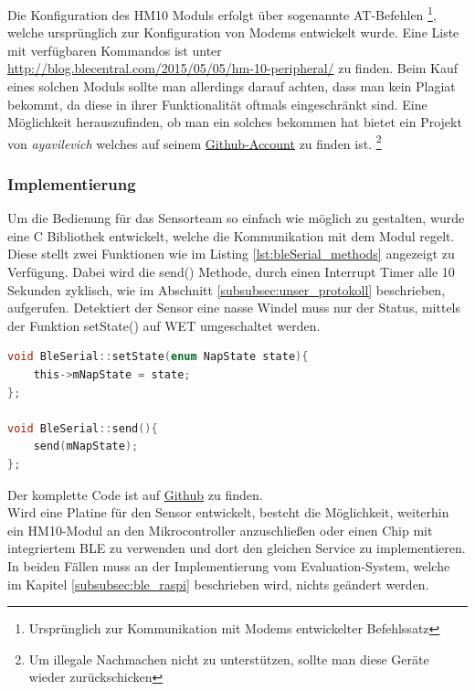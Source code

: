 Die Konfiguration des HM10 Moduls erfolgt über sogenannte AT-Befehlen \footnote{Ursprünglich zur Kommunikation mit Modems entwickelter Befehlssatz}, welche ursprünglich zur Konfiguration von Modems entwickelt wurde. Eine Liste mit verfügbaren Kommandos ist unter \url{http://blog.blecentral.com/2015/05/05/hm-10-peripheral/} zu finden. Beim Kauf eines solchen Moduls sollte man allerdings darauf achten, dass man kein Plagiat bekommt, da diese in ihrer Funktionalität oftmals eingeschränkt sind. Eine Möglichkeit herauszufinden, ob man ein solches bekommen hat bietet ein Projekt von \textit{ayavilevich} welches auf seinem \href{https://github.com/ayavilevich/arduino-ble-ident-n-set}{Github-Account} zu finden ist. \footnote{Um illegale Nachmachen nicht zu unterstützen, sollte man diese Geräte wieder zurückschicken} 

\subsubsection{Implementierung}
Um die Bedienung für das Sensorteam so einfach wie möglich zu gestalten, wurde eine C Bibliothek entwickelt, welche die Kommunikation mit dem Modul regelt. Diese stellt zwei Funktionen wie im Listing \ref{lst:bleSerial_methods} angezeigt zu Verfügung. Dabei wird die send() Methode, durch einen Interrupt Timer alle 10 Sekunden zyklisch, wie im Abschnitt \ref{subsubsec:unser_protokoll} beschrieben, aufgerufen. Detektiert der Sensor eine nasse Windel muss nur der Status, mittels der Funktion setState() auf \glqq{} WET \grqq{}  umgeschaltet werden.

\begin{lstlisting}[language=C, caption=send und setState Methoden aus der BleSerial bibliothek, label=lst:bleSerial_methods ]
void BleSerial::setState(enum NapState state){
	this->mNapState = state;
};

void BleSerial::send(){
	send(mNapState);
};
\end{lstlisting}

Der komplette Code ist auf \href{https://github.com/jomaway/poop-face-detection_sensor/tree/master/arduino/libraries/BleSerial}{Github}  zu finden. \\

Wird eine Platine für den Sensor entwickelt, besteht die Möglichkeit, weiterhin ein HM10-Modul an den Mikrocontroller anzuschließen oder einen Chip mit integriertem BLE zu verwenden und dort den gleichen Service zu implementieren. In beiden Fällen muss an der Implementierung vom Evaluation-System, welche im Kapitel \ref{subsubsec:ble_raspi} beschrieben wird, nichts geändert werden.

